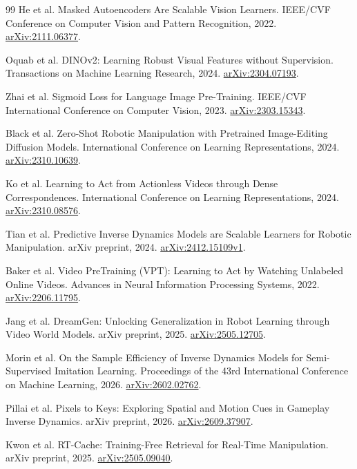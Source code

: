 \documentclass[10pt,twocolumn,letterpaper]{article}
\begin{document}
{\begin{thebibliography}{99}
He et al. Masked Autoencoders Are Scalable Vision Learners. IEEE/CVF Conference on Computer Vision and Pattern Recognition, 2022. \href{https://arxiv.org/abs/2111.06377}{arXiv:2111.06377}.

Oquab et al. DINOv2: Learning Robust Visual Features without Supervision. Transactions on Machine Learning Research, 2024. \href{https://arxiv.org/abs/2304.07193}{arXiv:2304.07193}.

Zhai et al. Sigmoid Loss for Language Image Pre-Training. IEEE/CVF International Conference on Computer Vision, 2023. \href{https://arxiv.org/abs/2303.15343}{arXiv:2303.15343}.

Black et al. Zero-Shot Robotic Manipulation with Pretrained Image-Editing Diffusion Models. International Conference on Learning Representations, 2024. \href{https://arxiv.org/abs/2310.10639}{arXiv:2310.10639}.

Ko et al. Learning to Act from Actionless Videos through Dense Correspondences. International Conference on Learning Representations, 2024. \href{https://arxiv.org/abs/2310.08576}{arXiv:2310.08576}.

Tian et al. Predictive Inverse Dynamics Models are Scalable Learners for Robotic Manipulation. arXiv preprint, 2024. \href{https://arxiv.org/abs/2412.15109v1}{arXiv:2412.15109v1}.

Baker et al. Video PreTraining (VPT): Learning to Act by Watching Unlabeled Online Videos. Advances in Neural Information Processing Systems, 2022. \href{https://arxiv.org/abs/2206.11795}{arXiv:2206.11795}.

Jang et al. DreamGen: Unlocking Generalization in Robot Learning through Video World Models. arXiv preprint, 2025. \href{https://arxiv.org/abs/2505.12705v2}{arXiv:2505.12705}.

Morin et al. On the Sample Efficiency of Inverse Dynamics Models for Semi-Supervised Imitation Learning. Proceedings of the 43rd International Conference on Machine Learning, 2026. \href{https://arxiv.org/abs/2602.02762}{arXiv:2602.02762}.

Pillai et al. Pixels to Keys: Exploring Spatial and Motion Cues in Gameplay Inverse Dynamics. arXiv preprint, 2026. \href{https://arxiv.org/abs/2609.37907}{arXiv:2609.37907}.

Kwon et al. RT-Cache: Training-Free Retrieval for Real-Time Manipulation. arXiv preprint, 2025. \href{https://arxiv.org/abs/2505.09040v3}{arXiv:2505.09040}.


\end{thebibliography}}
\end{document}
